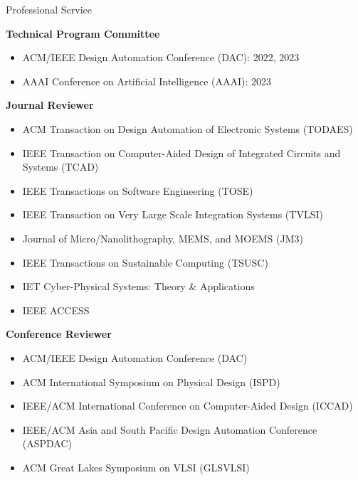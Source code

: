 \iftrue
\begin{rSection}{Professional Service}
	
\textbf{Technical Program Committee}
\begin{itemize}
	\item ACM/IEEE Design Automation Conference (DAC): 2022, 2023
	\item AAAI Conference on Artificial Intelligence (AAAI): 2023
\end{itemize}

\textbf{Journal Reviewer}
\begin{itemize}
    \item ACM Transaction on Design Automation of Electronic Systems (TODAES)
    \item IEEE Transaction on Computer-Aided Design of Integrated Circuits and Systems (TCAD)
    \item IEEE Transactions on Software Engineering (TOSE)
    \item IEEE Transaction on Very Large Scale Integration Systems (TVLSI)
    \item Journal of Micro/Nanolithography, MEMS, and MOEMS (JM3)
    \item IEEE Transactions on Sustainable Computing (TSUSC)
    \item IET Cyber-Physical Systems: Theory \& Applications
    \item IEEE ACCESS
\end{itemize}

\textbf{Conference Reviewer}
\begin{itemize}
    \item ACM/IEEE Design Automation Conference (DAC)
    \item ACM International Symposium on Physical Design (ISPD)
    \item IEEE/ACM International Conference on Computer-Aided Design (ICCAD)
    \item IEEE/ACM Asia and South Pacific Design Automation Conference (ASPDAC)
	\item ACM Great Lakes Symposium on VLSI (GLSVLSI)
\end{itemize}
\end{rSection}
\fi

